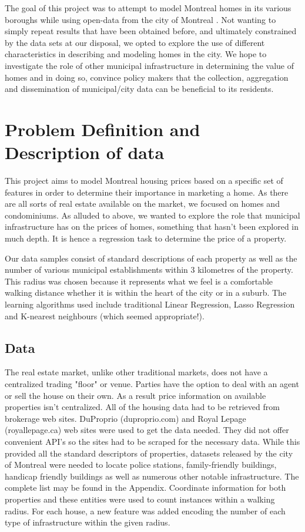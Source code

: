 \documentclass{acm_proc_article-sp}
\begin{document}
	The goal of this project was to attempt to model Montreal homes in its various boroughs while using open-data from the city of Montreal \cite{data}. Not wanting to simply repeat results that have been obtained before, and ultimately constrained by the data sets at our disposal, we opted to explore the use of different characteristics in describing and modeling homes in the city. We hope to investigate the role of other municipal infrastructure in determining the value of homes and in doing so, convince policy makers that the collection, aggregation and dissemination of municipal/city data can be beneficial to its residents.

\section{Problem Definition and Description of data}
	
	This project aims to model Montreal housing prices based on a specific set of features in order to determine their importance in marketing a home. As there are all sorts of real estate available on the market, we focused on homes and condominiums. As alluded to above, we wanted to explore the role that municipal infrastructure has on the prices of homes, something that hasn't been explored in much depth. It is hence a regression task to determine the price of a property.
	
	Our data samples consist of standard descriptions of each property as well as the number of various municipal establishments within 3 kilometres of the property. This radius was chosen because it represents what we feel is a comfortable walking distance whether it is within the heart of the city or in a suburb. The learning algorithms used include traditional Linear Regression, Lasso Regression and K-nearest neighbours (which seemed appropriate!). 

\subsection{Data}

	The real estate market, unlike other traditional markets, does not have a centralized trading "floor" or venue. Parties have the option to deal with an agent or sell the house on their own. As a result price information on available properties isn't centralized. All of the housing data had to be retrieved from brokerage web sites. DuProprio (duproprio.com) and Royal Lepage  (royallepage.ca) web sites were used to get the data needed. They did not offer convenient API's so the sites had to be scraped for the necessary data. While this provided all the standard descriptors of properties, datasets released by the city of Montreal were needed to locate police stations, family-friendly buildings, handicap friendly buildings as well as numerous other notable infrastructure. The complete list may be found in the Appendix. Coordinate information for both properties and these entities were used to count instances within a walking radius. For each house, a new feature was added encoding the number of each type of infrastructure within the given radius.
	
\end{document}
